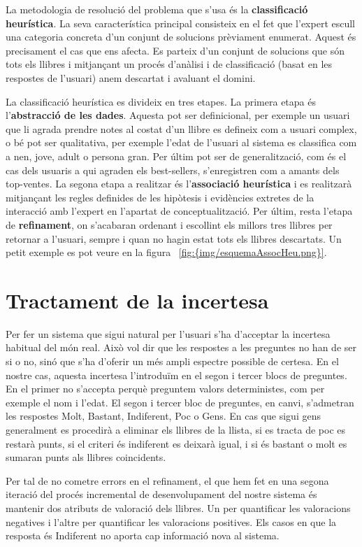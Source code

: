 La metodologia de resolució del problema que s'usa és la \textbf{classificació heurística}. La seva característica principal consisteix en el fet que l'expert escull una categoria concreta d'un conjunt de solucions prèviament enumerat. Aquest és precisament el cas que ens afecta. Es parteix d'un conjunt de solucions que són tots els llibres i mitjançant un procés d'anàlisi i de classificació (basat en les respostes de l'usuari) anem descartat i avaluant el domini.

La classificació heurística es divideix en tres etapes. La primera etapa és l'\textbf{abstracció de les dades}. Aquesta pot ser definicional, per exemple un usuari que li agrada prendre notes al costat d'un llibre es defineix com a usuari complex, o bé pot ser qualitativa, per exemple l'edat de l'usuari al sistema es classifica com a nen, jove, adult o persona gran. Per últim pot ser de generalització, com és el cas dels usuaris a qui agraden els best-sellers, s'enregistren com a amants dels top-ventes. La segona etapa a realitzar és l'\textbf{associació heurística} i es realitzarà mitjançant les regles definides de les hipòtesis i evidències extretes de la interacció amb l'expert en l'apartat de conceptualització. Per últim, resta l'etapa de \textbf{refinament}, on s'acabaran ordenant i escollint els millors tres llibres per retornar a l'usuari, sempre i quan no hagin estat tots els llibres descartats. Un petit exemple es pot veure en la figura  ~\ref{fig:{img/esquemaAssocHeu.png}}.


\section{Tractament de la incertesa}

Per fer un sistema que sigui natural per l'usuari s'ha d'acceptar la incertesa habitual del món real. Això vol dir que les respostes a les preguntes no han de ser si o no, sinó que s'ha d'oferir un més ampli espectre possible de certesa. En el nostre cas, aquesta incertesa l'introduïm en el segon i tercer blocs de preguntes. En el primer no s'accepta perquè preguntem valors deterministes, com per exemple el nom i l'edat. El segon i tercer bloc de preguntes, en canvi, s'admetran les respostes Molt, Bastant, Indiferent, Poc o Gens. En cas que sigui gens generalment es procedirà a eliminar els llibres de la llista, si es tracta de poc es restarà punts, si el criteri és indiferent es deixarà igual, i si és bastant o molt es sumaran punts als llibres coincidents.

Per tal de no cometre errors en el refinament, el que hem fet en una segona iteració del procés incremental de desenvolupament del nostre sistema és mantenir dos atributs de valoració dels llibres. Un per quantificar les valoracions negatives i l'altre per quantificar les valoracions positives. Els casos en que la resposta és Indiferent no aporta cap informació nova al sistema.


